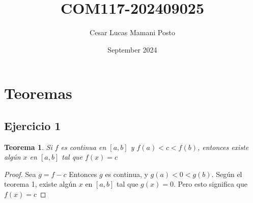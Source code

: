\documentclass{article}
\title{COM117-202409025}
\author{Cesar Lucas Mamani Posto}
\date{September 2024}
\theoremstyle{plain}
\newtheorem{theorem} {Teorema} [section]
\begin{document}
\maketitle

\section{Teoremas}
\subsection{Ejercicio 1}
\begin{theorem}
Si \(f\) es continua en \([a, b]\) y \(f(a) < c < f(b)\), entonces existe algún \(x\) en \([a, b]\) tal que \(f(x) = c\)
\end{theorem}
\begin{proof}
Sea \(g=f-c\) Entonces \(g\) es continua, y \(g(a)<0<g(b)\). Según el teorema 1, existe algún \(x\) en \([a, b]\) tal que \(g(x) = 0\). Pero esto significa que \(f(x) = c\)
\end{proof}
\end{document}
